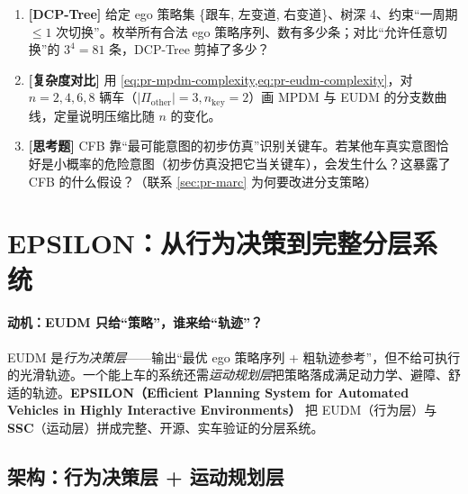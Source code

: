 \begin{practice}
\begin{enumerate}
  \item \textbf{[DCP-Tree]} 给定 ego 策略集 \{跟车, 左变道, 右变道\}、树深 4、约束“一周期 $\le 1$ 次切换”。枚举所有合法 ego 策略序列、数有多少条；对比“允许任意切换”的 $3^4=81$ 条，DCP-Tree 剪掉了多少？
  \item \textbf{[复杂度对比]} 用 \cref{eq:pr-mpdm-complexity,eq:pr-eudm-complexity}，对 $n=2,4,6,8$ 辆车（$|\Pi_{\mathrm{other}}|=3,n_{\mathrm{key}}=2$）画 MPDM 与 EUDM 的分支数曲线，定量说明压缩比随 $n$ 的变化。
  \item \textbf{[思考题]} CFB 靠“最可能意图的初步仿真”识别关键车。若某他车真实意图恰好是小概率的危险意图（初步仿真没把它当关键车），会发生什么？这暴露了 CFB 的什么假设？（联系 \cref{sec:pr-marc} 为何要改进分支策略）
\end{enumerate}
\end{practice}

\section{EPSILON：从行为决策到完整分层系统}
\label{sec:pr-epsilon}

\paragraph{动机：EUDM 只给“策略”，谁来给“轨迹”？}
EUDM 是\emph{行为决策层}——输出“最优 ego 策略序列 + 粗轨迹参考”，但不给可执行的光滑轨迹。一个能上车的系统还需\emph{运动规划层}把策略落成满足动力学、避障、舒适的轨迹。\textbf{EPSILON（Efficient Planning System for Automated Vehicles in Highly Interactive Environments）}\cite{ding2021epsilon} 把 EUDM（行为层）与 \textbf{SSC}（运动层）拼成完整、开源、实车验证的分层系统。

\subsection{架构：行为决策层 + 运动规划层}
\label{sec:pr-epsilon-arch}


